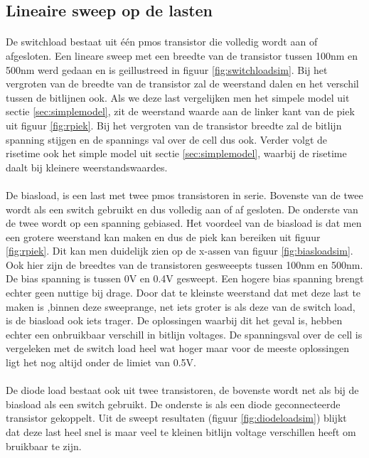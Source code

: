\subsection{Lineaire sweep op de lasten}\label{sec:linload}
\paragraph{}
De switchload bestaat uit \'{e}\'{e}n pmos transistor die volledig wordt aan of afgesloten. Een lineare sweep met een breedte van de transistor tussen 100nm en 500nm werd gedaan en is geillustreed in figuur \ref{fig:switchloadsim}. Bij het vergroten van de breedte van de transistor zal de weerstand dalen en het verschil tussen de bitlijnen ook. Als we deze last vergelijken men het simpele model uit sectie \ref{sec:simplemodel}, zit de weerstand waarde aan de linker kant van de piek uit figuur \ref{fig:rpiek}. Bij het vergroten van de transistor breedte zal de bitlijn spanning stijgen en de spannings val over de cell dus ook. Verder volgt de risetime ook het simple model uit sectie \ref{sec:simplemodel}, waarbij de risetime daalt bij kleinere weerstandswaardes.

\paragraph{}
De biasload, is een last met twee pmos transistoren in serie. Bovenste van de twee wordt als een switch gebruikt en dus volledig aan of af gesloten. De onderste van de twee wordt op een spanning gebiased. Het voordeel van de biasload is dat men een grotere weerstand kan maken en dus de piek kan bereiken uit figuur \ref{fig:rpiek}. Dit kan men duidelijk zien op de x-assen van figuur \ref{fig:biasloadsim}. Ook hier zijn de breedtes van de transistoren gesweeepts tussen 100nm en 500nm. De bias spanning is tussen 0V en 0.4V gesweept. Een hogere bias spanning brengt echter geen nuttige bij drage. Door dat te kleinste weerstand dat met deze last te maken is ,binnen deze sweeprange, net iets groter is als deze van de switch load, is de biasload ook iets trager. De oplossingen waarbij dit het geval is, hebben echter een onbruikbaar verschill in bitlijn voltages. De spanningsval over de cell is vergeleken met de switch load heel wat hoger maar voor de meeste oplossingen ligt het nog altijd onder de limiet van 0.5V.

\paragraph{}
De diode load bestaat ook uit twee transistoren, de bovenste wordt net als bij de biasload als een switch gebruikt. De onderste is als een diode geconnecteerde transistor gekoppelt. Uit de sweept resultaten (figuur \ref{fig:diodeloadsim}) blijkt dat deze last heel snel is maar veel te kleinen bitlijn voltage verschillen heeft om bruikbaar te zijn.

